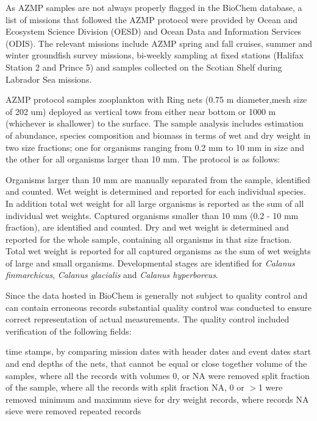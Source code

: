 \documentclass[letterpaper,portrait,11pt]{scrartcl}
\numberwithin{equation}{section}		%
\numberwithin{figure}{section}			%
\numberwithin{table}{section}				%
\begin{document}
\begin{itemize*}
\begin{appendices}
As AZMP samples are not always properly flagged in the BioChem database, a list of missions that followed the AZMP protocol were provided by Ocean and Ecosystem Science Division (OESD) and Ocean Data and Information Services (ODIS). The relevant missions include AZMP spring and fall cruises, summer and winter groundfish survey missions, bi-weekly sampling at fixed stations (Halifax Station 2 and Prince 5) and samples collected on the Scotian Shelf during Labrador Sea missions. 

AZMP protocol samples zooplankton with Ring nets (0.75 m diameter,mesh size of 202 um) deployed as vertical tows from either near bottom or 1000 m (whichever is shallower) to the surface. The sample analysis includes estimation of abundance, species composition and biomass in terms of wet and dry weight in two size fractions; one for organisms ranging from 0.2 mm to 10 mm in size and the other for all organisms larger than 10 mm.  The protocol is as follows:

	Organisms larger than 10 mm are manually separated from the sample, identified and counted. Wet weight is determined and reported for each individual species. In addition total wet weight for all large organisms is reported as the sum of all individual wet weights.
	Captured organisms smaller than 10 mm (0.2 - 10 mm fraction), are identified and counted. Dry and wet weight is determined and reported for the whole sample, containing all organisms in that size fraction.
	Total wet weight is reported for all captured organisms as the sum of wet weights of large and small organisms. 
	Developmental stages are identified for \textit{Calanus finmarchicus}, \textit{Calanus glacialis} and \textit{Calanus hyperboreus}.

Since the data hosted in BioChem is generally not subject to quality control and can contain erroneous records substantial quality control was conducted to ensure correct representation of actual measurements. The quality control included verification of the following fields: 

	time stamps, by comparing mission dates with header dates and event dates 
	start and end depths of the nets, that cannot be equal or close together
	volume of the samples, where all the records with volumes 0, or NA were removed
	split fraction of the sample, where all the records with split fraction NA, 0 or $>$1 were removed 
	minimum and maximum sieve for dry weight records, where records NA sieve were removed
	repeated records 


\end{appendices}
\end{itemize*}
\end{document}
